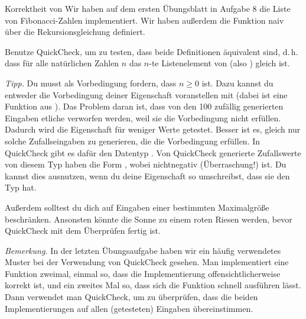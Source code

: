 \documentclass{uebblatt}
\newcommand{\refaufgabe}[1]{#1} %
\begin{document}
\begin{aufgabe}{Korrektheit von }
  Wir haben auf dem ersten Übungsblatt in Aufgabe \refaufgabe{8} die Liste
   von Fibonacci-Zahlen implementiert. Wir haben
  außerdem die Funktion  naiv über die
  Rekursionsgleichung  definiert.

  Benutze QuickCheck, um zu testen, dass beide Definitionen äquivalent sind,
  d.\,h. dass für alle natürlichen Zahlen $n$ das $n$-te Listenelement von
   (also ) gleich
   ist.
  
  \emph{Tipp.} Du musst als Vorbedingung fordern, dass $n \geq 0$ ist. Dazu
  kannst du entweder die Vorbedingung deiner Eigenschaft voranstellen mit
   (dabei ist \haskellinline{==>} eine Funktion
  aus ). Das Problem daran ist, dass von den 100
  zufällig generierten Eingaben etliche verworfen werden, weil sie die
  Vorbedingung nicht erfüllen. Dadurch wird die Eigenschaft für weniger Werte
  getestet. Besser ist es, gleich nur solche Zufallseingaben zu generieren, die
  die Vorbedingung erfüllen. In QuickCheck gibt es dafür den Datentyp
  . Von QuickCheck generierte Zufallswerte von
  diesem Typ haben die Form , wobei
   nichtnegativ (Überraschung!) ist. Du kannst dies
  ausnutzen, wenn du deine Eigenschaft so umschreibst, dass sie den Typ
   hat.
  
  Außerdem solltest du dich auf Eingaben einer bestimmten Maximalgröße
  beschränken. Ansonsten könnte die Sonne zu einem roten Riesen werden, bevor
  QuickCheck mit dem Überprüfen fertig ist.
\end{aufgabe}

\emph{Bemerkung.} In der letzten Übungsaufgabe haben wir ein häufig verwendetes
Muster bei der Verwendung von QuickCheck gesehen. Man implementiert eine
Funktion zweimal, einmal so, dass die Implementierung offensichtlicherweise
korrekt ist, und ein zweites Mal so, dass sich die Funktion schnell ausführen
lässt. Dann verwendet man QuickCheck, um zu überprüfen, dass die beiden
Implementierungen auf allen (getesteten) Eingaben übereinstimmen.
\end{document}
